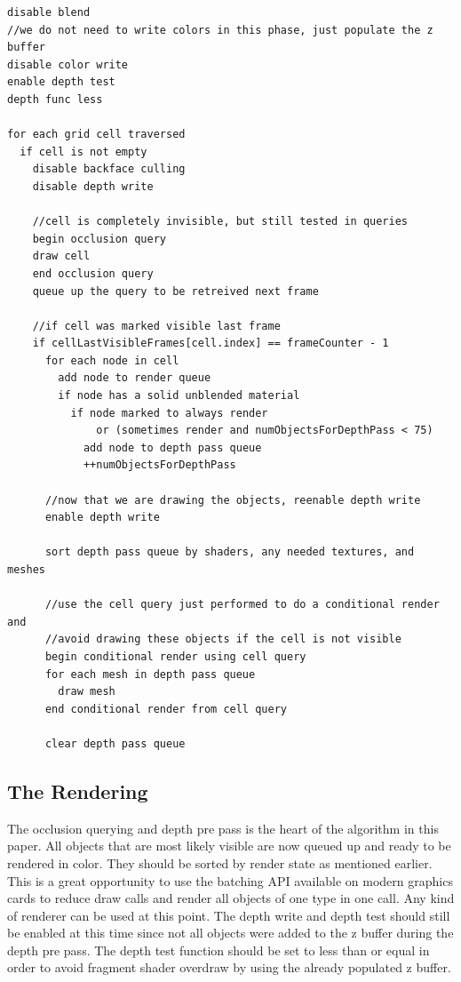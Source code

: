 \documentclass[12pt]{ucthesis}
\begin{document}
\begin{lstlisting}
disable blend
//we do not need to write colors in this phase, just populate the z buffer
disable color write
enable depth test
depth func less

for each grid cell traversed
  if cell is not empty
    disable backface culling
    disable depth write

    //cell is completely invisible, but still tested in queries	
    begin occlusion query
    draw cell
    end occlusion query
    queue up the query to be retreived next frame

    //if cell was marked visible last frame
    if cellLastVisibleFrames[cell.index] == frameCounter - 1
      for each node in cell
        add node to render queue
        if node has a solid unblended material
          if node marked to always render 
              or (sometimes render and numObjectsForDepthPass < 75)
            add node to depth pass queue
            ++numObjectsForDepthPass

      //now that we are drawing the objects, reenable depth write
      enable depth write

      sort depth pass queue by shaders, any needed textures, and meshes

      //use the cell query just performed to do a conditional render and
      //avoid drawing these objects if the cell is not visible
      begin conditional render using cell query
      for each mesh in depth pass queue
        draw mesh
      end conditional render from cell query

      clear depth pass queue
\end{lstlisting}

\subsection {The Rendering}
\label{the-rendering}

The occlusion querying and depth pre pass is the heart of the algorithm in this paper.
All objects that are most likely visible are now queued up and ready to be rendered in color.
They should be sorted by render state as mentioned earlier.
This is a great opportunity to use the batching API available on modern graphics cards to reduce draw calls and render all objects of one type in one call.
Any kind of renderer can be used at this point.
The depth write and depth test should still be enabled at this time since not all objects were added to the z buffer during the depth pre pass.
The depth test function should be set to less than or equal in order to avoid fragment shader overdraw by using the already populated z buffer.
\end{document}
